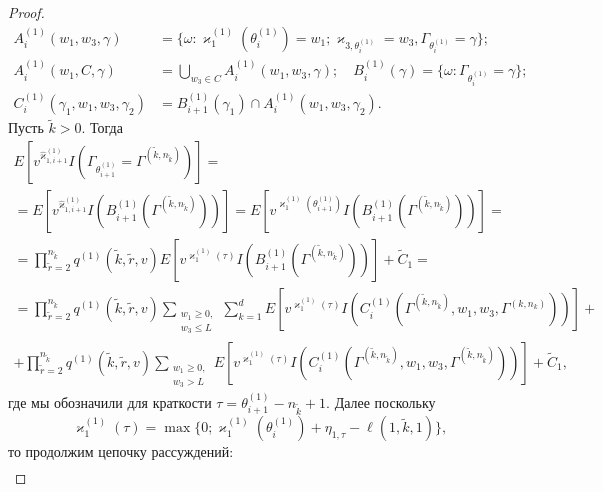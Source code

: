 \begin{proof}
\begin{align*}
  A_i^{(1)}(w_1,w_3,\gamma) &= \{\omega\colon \varkappa_{1}^{(1)}(\theta_{i}^{(1)})=w_1; \varkappa_{3,\theta_{i}^{(1)}}=w_3, \Gamma_{\theta_{i}^{(1)}}=\gamma\};\\
  A_i^{(1)}(w_1,C,\gamma) &= \bigcup_{w_3 \in C} A_i^{(1)}(w_1,w_3,\gamma);\quad B_i^{(1)}(\gamma) =\{\omega\colon \Gamma_{\theta_{i}^{(1)}}=\gamma\};\\
  C_i^{(1)}(\gamma_1,w_1,w_3,\gamma_2)&= B_{i+1}^{(1)}(\gamma_1) \cap A_i^{(1)}(w_1,w_3,\gamma_2) .
\end{align*}
Пусть $\tilde{k}>0$. Тогда
\begin{multline*}
  E[v^{\hat{\varkappa}_{1,i+1}^{(1)}} I(\Gamma_{\theta_{i+1}^{(1)}}= \Gamma^{(\tilde{k},n_{\tilde{k}})})] =\\=E[v^{\hat{\varkappa}_{1,i+1}^{(1)}} I(B_{i+1}^{(1)}(\Gamma^{(\tilde{k},n_{\tilde{k}})}))] 
  =E[v^{\varkappa_{1}^{(1)}(\theta_{i+1}^{(1)})} I(B_{i+1}^{(1)}(\Gamma^{(\tilde{k},n_{\tilde{k}})}))] =\\
  =\prod_{\tilde{r}=2}^{n_{\tilde{k}}} q^{(1)}(\tilde{k},\tilde{r},v) E[v^{\varkappa_{1}^{(1)}(\tau)} I(B_{i+1}^{(1)}(\Gamma^{(\tilde{k},n_{\tilde{k}})}))] + \widetilde{C}_1=\\
  =\prod_{\tilde{r}=2}^{n_{\tilde{k}}} q^{(1)}(\tilde{k},\tilde{r},v) \sum_{\substack{w_1\geqslant 0, \\ w_3 \leqslant L}} \sum_{k=1}^d E[v^{\varkappa_{1}^{(1)}(\tau)} I( C_i^{(1)}(\Gamma^{(\tilde{k},n_{\tilde{k}})},w_1,w_3,\Gamma^{(k,n_k)} ))] + \\ +
    \prod_{\tilde{r}=2}^{n_{\tilde{k}}} q^{(1)}(\tilde{k},\tilde{r},v) \sum_{\substack{w_1\geqslant 0, \\ w_3 > L}}  E[v^{\varkappa_{1}^{(1)}(\tau)} I( C_i^{(1)}(\Gamma^{(\tilde{k},n_{\tilde{k}})},w_1,w_3,\Gamma^{(\tilde{k},n_{\tilde{k}})} ))] +\widetilde{C}_1,
\end{multline*}
где мы обозначили для краткости $\tau = \theta_{i+1}^{(1)} -n_{\tilde{k}} + 1$.
Далее поскольку 
$$\varkappa_{1}^{(1)}(\tau) = \max{\{0; \varkappa_{1 }^{(1)}(\theta_{i}^{(1)}) +\eta_{1,\tau}-\ell(1,\tilde{k},1) \}},
$$
то продолжим цепочку рассуждений:
\begin{multline}

\end{multline}
\end{proof}
